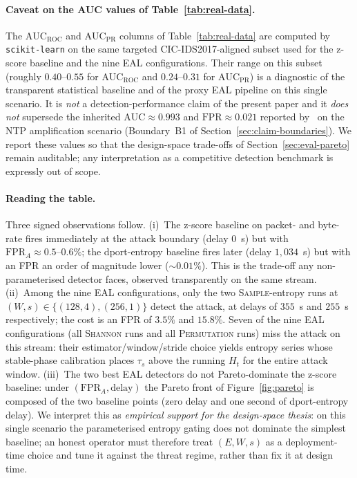 \documentclass[runningheads]{llncs}
\newcommand{\taus}{\ensuremath{\tau_{s}}}
\begin{document}
\paragraph{Caveat on the AUC values of Table~\ref{tab:real-data}.} The
$\text{AUC}_{\text{ROC}}$ and $\text{AUC}_{\text{PR}}$ columns of
Table~\ref{tab:real-data} are computed by \texttt{scikit-learn} on the
same targeted CIC-IDS2017-aligned subset used for the z-score baseline
and the nine EAL configurations. Their range on this subset (roughly
$0.40$--$0.55$ for $\text{AUC}_{\text{ROC}}$ and $0.24$--$0.31$ for
$\text{AUC}_{\text{PR}}$) is a diagnostic of the transparent statistical
baseline and of the proxy EAL pipeline on this single scenario. It is
\emph{not} a detection-performance claim of the present paper and it
\emph{does not} supersede the inherited $\text{AUC} \approx 0.993$ and
$\text{FPR} \approx 0.021$ reported by~\cite{paper3} on the NTP
amplification scenario (Boundary~B1 of
Section~\ref{sec:claim-boundaries}). We report these values so that the
design-space trade-offs of Section~\ref{sec:eval-pareto} remain
auditable; any interpretation as a competitive detection benchmark is
expressly out of scope.

\paragraph{Reading the table.} Three signed observations follow.
(i)~The z-score baseline on packet- and byte-rate fires immediately at
the attack boundary (delay $0$~s) but with $\text{FPR}_{\!A} \approx
0.5\text{--}0.6\%$; the dport-entropy baseline fires later
(delay $1{,}034$~s) but with an FPR an order of magnitude lower
($\sim$$0.01\%$). This is the trade-off any non-parameterised detector
faces, observed transparently on the same stream.
(ii)~Among the nine EAL configurations, only the two
\textsc{Sample}-entropy runs at $(W,s) \in \{(128,4), (256,1)\}$ detect
the attack, at delays of $355$~s and $255$~s respectively; the cost is
an FPR of $3.5\%$ and $15.8\%$. Seven of the nine EAL configurations
(all \textsc{Shannon} runs and all \textsc{Permutation} runs) miss the
attack on this stream: their estimator/window/stride choice yields
entropy series whose stable-phase calibration places $\taus$ above the
running $H_t$ for the entire attack window.
(iii)~The two best EAL detectors do not Pareto-dominate the z-score
baseline: under $(\text{FPR}_{\!A}, \text{delay})$ the Pareto front of
Figure~\ref{fig:pareto} is composed of the two baseline points (zero
delay and one second of dport-entropy delay).
We interpret this as \emph{empirical support for the design-space
thesis}: on this single scenario the parameterised entropy gating does
not dominate the simplest baseline; an honest operator must therefore
treat $(E, W, s)$ as a deployment-time choice and tune it against the
threat regime, rather than fix it at design time.
\end{document}
